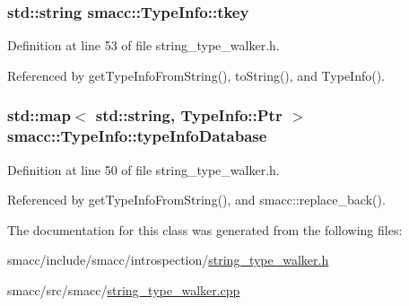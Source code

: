 \subsubsection[{\texorpdfstring{tkey}{tkey}}]{\setlength{\rightskip}{0pt plus 5cm}std\+::string smacc\+::\+Type\+Info\+::tkey\hspace{0.3cm}{\ttfamily [private]}}\hypertarget{classsmacc_1_1TypeInfo_ab61d47adea9dbc8b678e06f627d6b1a3}{}\label{classsmacc_1_1TypeInfo_ab61d47adea9dbc8b678e06f627d6b1a3}


Definition at line 53 of file string\+\_\+type\+\_\+walker.\+h.



Referenced by get\+Type\+Info\+From\+String(), to\+String(), and Type\+Info().

\subsubsection[{\texorpdfstring{type\+Info\+Database}{typeInfoDatabase}}]{\setlength{\rightskip}{0pt plus 5cm}std\+::map$<$ std\+::string, {\bf Type\+Info\+::\+Ptr} $>$ smacc\+::\+Type\+Info\+::type\+Info\+Database\hspace{0.3cm}{\ttfamily [static]}}\hypertarget{classsmacc_1_1TypeInfo_a5dafa5950a93f6cd5b88d5ea573a504c}{}\label{classsmacc_1_1TypeInfo_a5dafa5950a93f6cd5b88d5ea573a504c}


Definition at line 50 of file string\+\_\+type\+\_\+walker.\+h.



Referenced by get\+Type\+Info\+From\+String(), and smacc\+::replace\+\_\+back().



The documentation for this class was generated from the following files\+:\begin{DoxyCompactItemize}
\item 
smacc/include/smacc/introspection/\hyperlink{string__type__walker_8h}{string\+\_\+type\+\_\+walker.\+h}\item 
smacc/src/smacc/\hyperlink{string__type__walker_8cpp}{string\+\_\+type\+\_\+walker.\+cpp}\end{DoxyCompactItemize}
